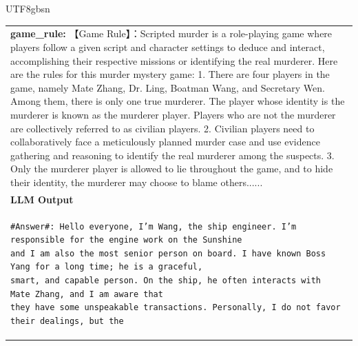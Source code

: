 \documentclass[11pt]{article}
\begin{document}
{\begin{CJK}{UTF8}{gbsn}
\begin{table}[ht!]
\begin{minipage}[t]{\linewidth}
\begin{tabular}{|m{16cm}|}
 \textbf{   game\_rule:} \small【Game Rule】：Scripted murder is a role-playing game where players follow a given script and character settings to deduce and interact, accomplishing their respective missions or identifying the real murderer. Here are the rules for this murder mystery game: 1. There are four players in the game, namely Mate Zhang, Dr. Ling, Boatman Wang, and Secretary Wen. Among them, there is only one true murderer. The player whose identity is the murderer is known as the murderer player. Players who are not the murderer are collectively referred to as civilian players. 2. Civilian players need to collaboratively face a meticulously planned murder case and use evidence gathering and reasoning to identify the real murderer among the suspects. 3. Only the murderer player is allowed to lie throughout the game, and to hide their identity, the murderer may choose to blame others......\\
\rowcolor{lightgray}  \textbf{LLM Output}  \\
\hline
\small\begin{verbatim}
#Answer#: Hello everyone, I’m Wang, the ship engineer. I’m responsible for the engine work on the Sunshine
and I am also the most senior person on board. I have known Boss Yang for a long time; he is a graceful,
smart, and capable person. On the ship, he often interacts with  Mate Zhang, and I am aware that 
they have some unspeakable transactions. Personally, I do not favor their dealings, but the 

\end{verbatim}
\end{tabular}
\end{minipage}
\end{table}
\end{CJK}}
\end{document}
